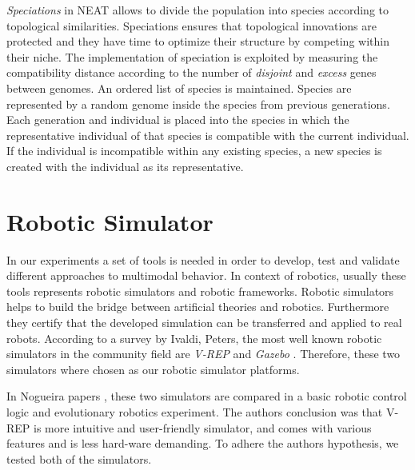 \documentclass[format=acmsmall, review=false, screen=true]{acmart}
\begin{document}
\emph{Speciations} in NEAT allows to divide the population into species according to topological similarities. Speciations ensures that topological innovations are protected and they have time to optimize their structure by competing within their niche. The implementation of speciation is exploited by measuring the compatibility distance according to the number of \emph{disjoint} and \emph{excess} genes between genomes. An ordered list of species is maintained. Species are represented by a random genome inside the species from previous generations. Each generation and individual is placed into the species in which the representative individual of that species is compatible with the current individual. If the individual is incompatible within any existing species, a new species is created with the individual as its representative. 


\section{Robotic Simulator}

In our experiments a set of tools is needed in order to develop, test and validate different approaches to multimodal behavior. In context of robotics, usually these tools represents robotic simulators and robotic frameworks. Robotic simulators helps to build the bridge between artificial theories and robotics. Furthermore they certify that the developed simulation can be transferred and applied to real robots. According to a survey \cite{ivaldi2014tools} by Ivaldi, Peters, the most well known robotic simulators in the community field are \emph{V-REP}\cite{rohmer2013v} and \emph{Gazebo} \cite{koenig2004design}. Therefore, these two simulators where chosen as our robotic simulator platforms.

In Nogueira papers \cite{nogueira2014comparative}, these two simulators are compared in a basic robotic control logic and evolutionary robotics experiment. The authors conclusion was that V-REP is more intuitive and user-friendly simulator, and comes with various features and is less hard-ware demanding. To adhere the authors hypothesis, we tested both of the simulators.
\end{document}
